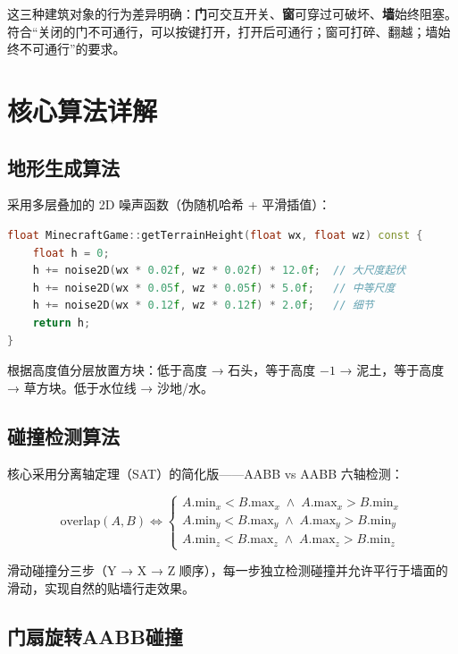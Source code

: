 \documentclass{article}
\begin{document}
这三种建筑对象的行为差异明确：\textbf{门}可交互开关、\textbf{窗}可穿过可破坏、\textbf{墙}始终阻塞。符合“关闭的门不可通行，可以按键打开，打开后可通行；窗可打碎、翻越；墙始终不可通行”的要求。

\section{核心算法详解}

\subsection{地形生成算法}

采用多层叠加的 2D 噪声函数（伪随机哈希 + 平滑插值）：

\begin{lstlisting}[language=C++]
float MinecraftGame::getTerrainHeight(float wx, float wz) const {
    float h = 0;
    h += noise2D(wx * 0.02f, wz * 0.02f) * 12.0f;  // 大尺度起伏
    h += noise2D(wx * 0.05f, wz * 0.05f) * 5.0f;   // 中等尺度
    h += noise2D(wx * 0.12f, wz * 0.12f) * 2.0f;   // 细节
    return h;
}
\end{lstlisting}

根据高度值分层放置方块：低于高度 → 石头，等于高度 $-1$ → 泥土，等于高度 → 草方块。低于水位线 → 沙地/水。

\subsection{碰撞检测算法}

核心采用分离轴定理（SAT）的简化版——AABB vs AABB 六轴检测：

\[
\text{overlap}(A,B) \iff 
\begin{cases}
A.\text{min}_x < B.\text{max}_x \;\land\; A.\text{max}_x > B.\text{min}_x \\
A.\text{min}_y < B.\text{max}_y \;\land\; A.\text{max}_y > B.\text{min}_y \\
A.\text{min}_z < B.\text{max}_z \;\land\; A.\text{max}_z > B.\text{min}_z
\end{cases}
\]

滑动碰撞分三步（Y → X → Z 顺序），每一步独立检测碰撞并允许平行于墙面的滑动，实现自然的贴墙行走效果。

\subsection{门扇旋转AABB碰撞}
\end{document}
